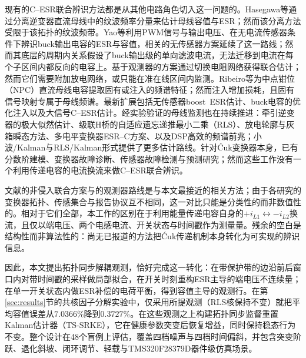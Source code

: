 \documentclass[zihao=5,a4paper]{ctexart}
\DeclareRobustCommand{\Cuk}{\mbox{\'{C}uk}}
\newcommand{\TSSRKE}{TS-SRKE}
\begin{document}
现有的C--ESR联合辨识方法都是从其他电路角色切入这一问题的。Hasegawa等\cite{hasegawa2018dclink}通过分离逆变器直流母线中的纹波频率分量来估计母线容值与ESR；然而该分离方法受限于该拓扑的纹波频带。Yao等\cite{yao2015buck}利用PWM信号与输出电压、在无电流传感器条件下辨识buck输出电容的ESR与容值，相关的无传感器方案延续了这一路线\cite{tang2019sensorless}；然而其底层的周期内关系假设了buck输出级的单向滤波电流，无法迁移到电流在每个子区间内都反向的电容上。基于观测器的方案\cite{barbulescu2022observer,barbulescu2023implementation,caiman2024quasionline}通过切换电阻网络获得联合估计；然而它们需要附加放电网络，或只能在准在线区间内监测。Ribeiro等\cite{ribeiro2025inherent,ribeiro2024injection,ribeiro2023wavelet}为中点钳位（NPC）直流母线电容提取固有或注入的频谱特征；然而注入增加损耗，且固有信号映射专属于母线频谱。最新扩展包括无传感器boost~ESR估计、buck电容的优化注入以及大信号C--ESR估计\cite{leong2025boostesr,zhang2025injection,zhang2025largesignal}。经实验验证的母线监测也在持续推进：牵引逆变器的极大似然估计、级联H桥的自适应遗忘递推最小二乘（RLS）、放电轮廓与灰箱瞬态方法、多电平变换器ESR--C方案、以及DSP高效的频谱前兆\cite{wu2025mlrail,wang2024chb,wei2024discharge,zhao2023greybox,deng2020mmc,asoodar2024mmc,sundararajan2020goertzel}；小波/Kalman与RLS/Kalman形式提供了更多估计路线\cite{amaral2024waveletkf,zhang2025haar,reichbach2016rls,chen2018vffrls}。针对\Cuk{}变换器本身，已有分数阶建模、变换器故障诊断、传感器故障检测与预测研究\cite{wang2021fractionalcuk,prathiba2023cuk,ajra2024sensorfault,samie2015prognostic}；然而这些工作没有一个利用传递电容的电流换流来做C--ESR联合辨识。

文献\cite{hasegawa2018dclink,yao2015buck,ribeiro2025inherent,amaral2024waveletkf}的非侵入联合方案与\cite{barbulescu2022observer}的观测器路线是与本文最接近的相关方法；由于各研究的变换器拓扑、传感集合与报告协议互不相同，这一对比只能是分类性的而非数值性的。相对于它们全部，本工作的区别在于利用能量传递电容自身的$+i_{L1}\leftrightarrow-i_{L2}$换流，且仅以端电压、两个电感电流、开关状态与时间戳作为测量量。残余的空白是结构性而非算法性的：尚无已报道的方法把\Cuk{}传递机制本身转化为可实现的辨识信息。

因此，本文提出拓扑同步解耦观测，恰好完成这一转化：在带保护带的边沿前后窗口内对带时间戳的采样做局部拟合，在开关时刻重构ESR主导的端电压不连续量；在单一开关状态内做ESR补偿的电荷平衡，得到容值主导的观测行。在第\ref{sec:results}节的共核因子分解实验中，仅采用所提观测（RLS核保持不变）就把平均容值误差从$7.0366\%$降到$0.3727\%$。在这些观测之上构建拓扑同步监督重置Kalman估计器（\TSSRKE{}），它在健康参数突变后恢复增益，同时保持稳态行为不变。整个设计在48个盲例上评估，覆盖四档噪声与四档时间偏斜，并包含突变阶跃、退化斜坡、闭环调节、轻载与TMS320F28379D器件级仿真场景。
\end{document}
